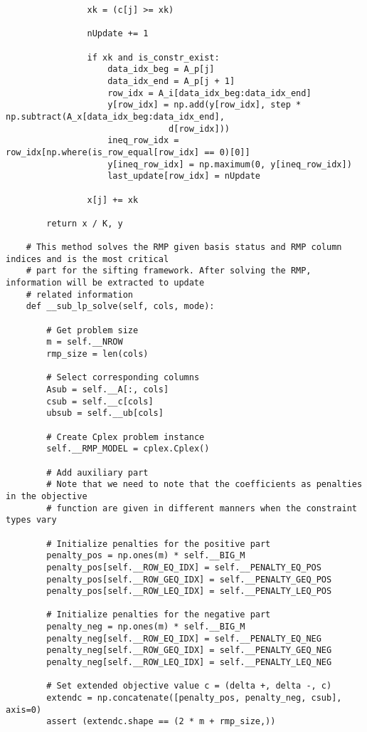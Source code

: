 \documentclass{article}
\begin{document}
\begin{lstlisting}
                xk = (c[j] >= xk)

                nUpdate += 1

                if xk and is_constr_exist:
                    data_idx_beg = A_p[j]
                    data_idx_end = A_p[j + 1]
                    row_idx = A_i[data_idx_beg:data_idx_end]
                    y[row_idx] = np.add(y[row_idx], step * np.subtract(A_x[data_idx_beg:data_idx_end], 
                    			d[row_idx]))
                    ineq_row_idx = row_idx[np.where(is_row_equal[row_idx] == 0)[0]]
                    y[ineq_row_idx] = np.maximum(0, y[ineq_row_idx])
                    last_update[row_idx] = nUpdate

                x[j] += xk

        return x / K, y

    # This method solves the RMP given basis status and RMP column indices and is the most critical 
    # part for the sifting framework. After solving the RMP, information will be extracted to update 
    # related information
    def __sub_lp_solve(self, cols, mode):

        # Get problem size
        m = self.__NROW
        rmp_size = len(cols)

        # Select corresponding columns
        Asub = self.__A[:, cols]
        csub = self.__c[cols]
        ubsub = self.__ub[cols]

        # Create Cplex problem instance
        self.__RMP_MODEL = cplex.Cplex()

        # Add auxiliary part
        # Note that we need to note that the coefficients as penalties in the objective 
        # function are given in different manners when the constraint types vary

        # Initialize penalties for the positive part
        penalty_pos = np.ones(m) * self.__BIG_M
        penalty_pos[self.__ROW_EQ_IDX] = self.__PENALTY_EQ_POS
        penalty_pos[self.__ROW_GEQ_IDX] = self.__PENALTY_GEQ_POS
        penalty_pos[self.__ROW_LEQ_IDX] = self.__PENALTY_LEQ_POS

        # Initialize penalties for the negative part
        penalty_neg = np.ones(m) * self.__BIG_M
        penalty_neg[self.__ROW_EQ_IDX] = self.__PENALTY_EQ_NEG
        penalty_neg[self.__ROW_GEQ_IDX] = self.__PENALTY_GEQ_NEG
        penalty_neg[self.__ROW_LEQ_IDX] = self.__PENALTY_LEQ_NEG

        # Set extended objective value c = (delta +, delta -, c)
        extendc = np.concatenate([penalty_pos, penalty_neg, csub], axis=0)
        assert (extendc.shape == (2 * m + rmp_size,))


\end{lstlisting}
\end{document}
